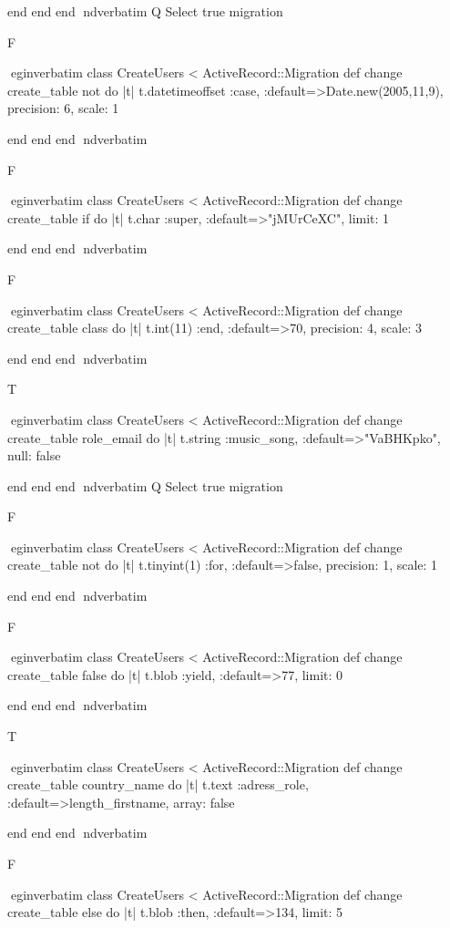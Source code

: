     end 
  end 
end
nd{verbatim}
Q
 Select true migration

F

egin{verbatim}
 class CreateUsers < ActiveRecord::Migration 
  def change 
    create_table not do |t| 
      t.datetimeoffset :case, :default=>Date.new(2005,11,9), precision: 6, scale: 1
    
    end 
  end 
end
nd{verbatim}

F

egin{verbatim}
 class CreateUsers < ActiveRecord::Migration 
  def change 
    create_table if do |t| 
      t.char :super, :default=>"jMUrCeXC", limit: 1
    
    end 
  end 
end
nd{verbatim}

F

egin{verbatim}
 class CreateUsers < ActiveRecord::Migration 
  def change 
    create_table class do |t| 
      t.int(11) :end, :default=>70, precision: 4, scale: 3
    
    end 
  end 
end
nd{verbatim}

T

egin{verbatim}
 class CreateUsers < ActiveRecord::Migration 
  def change 
    create_table role_email do |t| 
      t.string :music_song, :default=>"VaBHKpko", null: false
    
    end 
  end 
end
nd{verbatim}
Q
 Select true migration

F

egin{verbatim}
 class CreateUsers < ActiveRecord::Migration 
  def change 
    create_table not do |t| 
      t.tinyint(1) :for, :default=>false, precision: 1, scale: 1
    
    end 
  end 
end
nd{verbatim}

F

egin{verbatim}
 class CreateUsers < ActiveRecord::Migration 
  def change 
    create_table false do |t| 
      t.blob :yield, :default=>77, limit: 0
    
    end 
  end 
end
nd{verbatim}

T

egin{verbatim}
 class CreateUsers < ActiveRecord::Migration 
  def change 
    create_table country_name do |t| 
      t.text :adress_role, :default=>length_firstname, array: false
    
    end 
  end 
end
nd{verbatim}

F

egin{verbatim}
 class CreateUsers < ActiveRecord::Migration 
  def change 
    create_table else do |t| 
      t.blob :then, :default=>134, limit: 5
    
